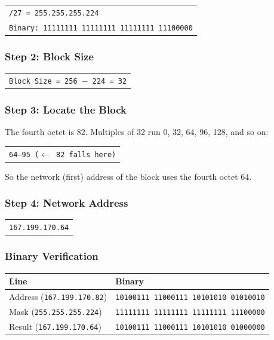 \documentclass[11pt,a4paper]{article}
\begin{document}
\begin{tabularx}{\textwidth}{@{}X@{}}
\texttt{/27 = 255.255.255.224} \\
\texttt{Binary: 11111111 11111111 11111111 11100000} \\
\end{tabularx}

\subsubsection*{Step 2: Block Size}

\begin{tabularx}{\textwidth}{@{}X@{}}
\texttt{Block Size = 256 $-$ 224 = 32} \\
\end{tabularx}

\subsubsection*{Step 3: Locate the Block}

The fourth octet is 82. Multiples of 32 run 0, 32, 64, 96, 128, and so on:

\begin{tabularx}{\textwidth}{@{}X@{}}
\texttt{64--95 ($\leftarrow$ 82 falls here)} \\
\end{tabularx}

So the network (first) address of the block uses the fourth octet 64.

\subsubsection*{Step 4: Network Address}

\begin{tabularx}{\textwidth}{@{}X@{}}
\texttt{167.199.170.64} \\
\end{tabularx}

\subsubsection*{Binary Verification}

\begin{tabularx}{\textwidth}{@{}lX@{}}
\toprule
\rowcolor{tablehead}\textbf{Line} & \textbf{Binary} \\
\midrule
Address (\texttt{167.199.170.82}) & \texttt{10100111 11000111 10101010 01010010} \\
Mask (\texttt{255.255.255.224}) & \texttt{11111111 11111111 11111111 11100000} \\
Result (\texttt{167.199.170.64}) & \texttt{10100111 11000111 10101010 01000000} \\
\bottomrule
\end{tabularx}
\end{document}

